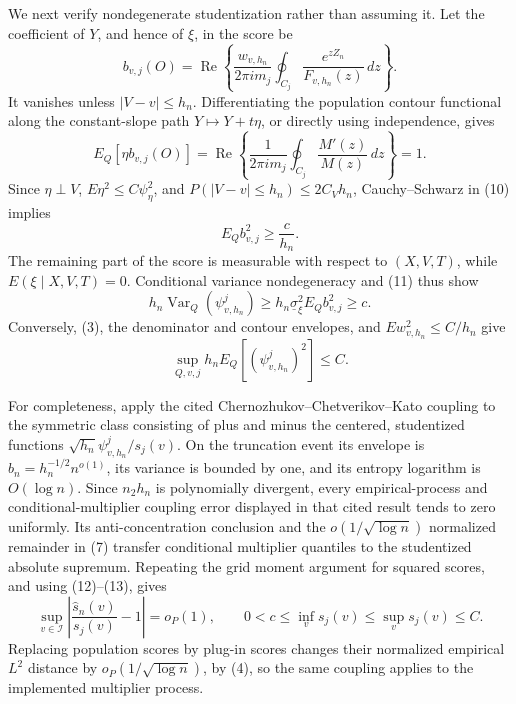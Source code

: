 We next verify nondegenerate studentization rather than assuming it.  Let the coefficient of \(Y\), and hence of \(\xi\), in the score be
\[
 b_{v,j}(O)=\operatorname{Re}\left\{
 \frac{w_{v,h_n}}{2\pi i m_j}
 \oint_{C_j}\frac{e^{zZ_n}}{F_{v,h_n}(z)}\,dz\right\}. \tag{9}
\]
It vanishes unless \(|V-v|\le h_n\).  Differentiating the population contour functional along the constant-slope path \(Y\mapsto Y+t\eta\), or directly using independence, gives
\[
 E_Q[\eta b_{v,j}(O)]
 =\operatorname{Re}\left\{\frac{1}{2\pi i m_j}
 \oint_{C_j}\frac{M'(z)}{M(z)}\,dz\right\}=1. \tag{10}
\]
Since \(\eta\perp V\), \(E\eta^2\le C\psi_\eta^2\), and \(P(|V-v|\le h_n)\le2C_Vh_n\), Cauchy--Schwarz in (10) implies
\[
 E_Qb_{v,j}^2\ge\frac{c}{h_n}. \tag{11}
\]
The remaining part of the score is measurable with respect to \((X,V,T)\), while \(E(\xi\mid X,V,T)=0\).  Conditional variance nondegeneracy and (11) thus show
\[
 h_n\operatorname{Var}_Q(\psi^j_{v,h_n})
 \ge h_n\underline\sigma_\xi^2E_Qb_{v,j}^2\ge c. \tag{12}
\]
Conversely, (3), the denominator and contour envelopes, and \(Ew_{v,h_n}^2\le C/h_n\) give
\[
 \sup_{Q,v,j}h_nE_Q[(\psi^j_{v,h_n})^2]\le C. \tag{13}
\]

For completeness, apply the cited Chernozhukov--Chetverikov--Kato coupling to the symmetric class consisting of plus and minus the centered, studentized functions \(\sqrt{h_n}\psi^j_{v,h_n}/s_j(v)\).  On the truncation event its envelope is \(b_n=h_n^{-1/2}n^{o(1)}\), its variance is bounded by one, and its entropy logarithm is \(O(\log n)\).  Since \(n_2h_n\) is polynomially divergent, every empirical-process and conditional-multiplier coupling error displayed in that cited result tends to zero uniformly.  Its anti-concentration conclusion and the \(o(1/\sqrt{\log n})\) normalized remainder in (7) transfer conditional multiplier quantiles to the studentized absolute supremum.  Repeating the grid moment argument for squared scores, and using (12)--(13), gives
\[
 \sup_{v\in\mathcal I}\left|\frac{\widehat s_n(v)}{s_j(v)}-1\right|=o_P(1),
 \qquad 0<c\le\inf_{v}s_j(v)\le\sup_{v}s_j(v)\le C. \tag{14}
\]
Replacing population scores by plug-in scores changes their normalized empirical \(L^2\) distance by \(o_P(1/\sqrt{\log n})\), by (4), so the same coupling applies to the implemented multiplier process.

